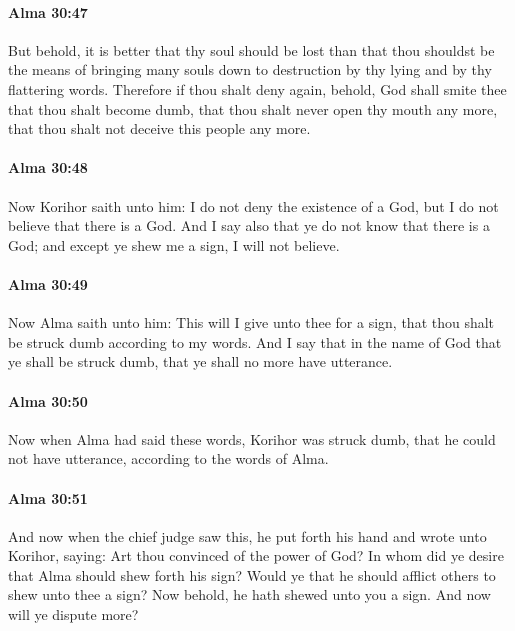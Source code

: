 		\paragraph{Alma 30:47} %
			\label{ALMA-30-47}

			But behold, it is better that thy soul should be lost
			than that thou shouldst be the means of bringing many souls down to destruction
			by thy lying and by thy flattering words.
			Therefore if thou shalt deny again,
			behold, God shall smite thee that thou shalt become dumb,
			that thou shalt never open thy mouth any more,
			that thou shalt not deceive this people any more.

		\paragraph{Alma 30:48} %
			\label{ALMA-30-48}

			Now Korihor saith unto him:
			I do not deny the existence of a God,
			but I do not believe that there is a God.
			And I say also that ye do not know that there is a God;
			and except ye shew me a sign, I will not believe.

		\paragraph{Alma 30:49} %
			\label{ALMA-30-49}

			Now Alma saith unto him:
			This will I give unto thee for a sign,
			that thou shalt be struck dumb according to my words.
			And I say that in the name of God that ye shall be struck dumb,
			that ye shall no more have utterance.

		\paragraph{Alma 30:50} %
			\label{ALMA-30-50}

			Now when Alma had said these words, Korihor was struck dumb,
			that he could not have utterance, according to the words of Alma.

		\paragraph{Alma 30:51} %
			\label{ALMA-30-51}

			And now when the chief judge saw this,
			he put forth his hand and wrote unto Korihor, saying:
			Art thou convinced of the power of God?
			In whom did ye desire that Alma should shew forth his sign?
			Would ye that he should afflict others to shew unto thee a sign?
			Now behold, he hath shewed unto you a sign.
			And now will ye dispute more?

